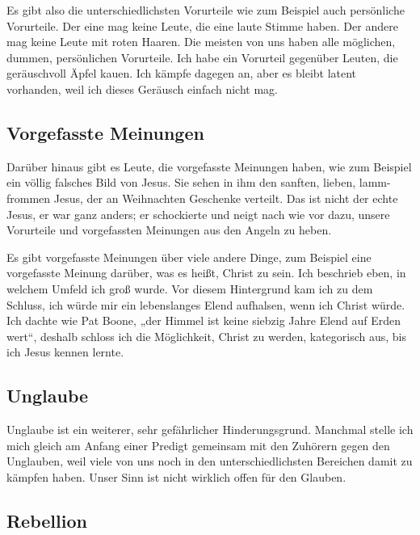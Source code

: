 Es gibt also die unterschiedlichsten Vorurteile wie zum Beispiel auch persönliche Vorurteile. 
Der eine mag keine Leute, die eine laute Stimme haben. 
Der andere mag keine Leute mit roten Haaren. Die meisten von uns haben alle möglichen, dummen, persönlichen Vorurteile. 
Ich habe ein Vorurteil gegenüber Leuten, die geräuschvoll Äpfel kauen. 
Ich kämpfe dagegen an, aber es bleibt latent vorhanden, weil ich dieses Geräusch einfach nicht mag.

\subsection{Vorgefasste Meinungen}

Darüber hinaus gibt es Leute, die vorgefasste Meinungen haben, wie zum Beispiel ein völlig falsches Bild von Jesus. 
Sie sehen in ihm den sanften, lieben, lamm-frommen Jesus, der an Weihnachten Geschenke verteilt. 
Das ist nicht der echte Jesus, er war ganz anders; er schockierte und neigt nach wie vor dazu, unsere Vorurteile und vorgefassten Meinungen aus den Angeln zu heben.

Es gibt vorgefasste Meinungen über viele andere Dinge, zum Beispiel eine vorgefasste Meinung darüber, was es heißt, Christ zu sein. 
Ich beschrieb eben, in welchem Umfeld ich groß wurde. 
Vor diesem Hintergrund kam ich zu dem Schluss, ich würde mir ein lebenslanges Elend aufhalsen, wenn ich Christ würde. 
Ich dachte wie Pat Boone, „der Himmel ist keine siebzig Jahre Elend auf Erden wert“, deshalb schloss ich die Möglichkeit, Christ zu werden, kategorisch aus, bis ich Jesus kennen lernte.

\subsection{Unglaube}

Unglaube ist ein weiterer, sehr gefährlicher Hinderungsgrund. 
Manchmal stelle ich mich gleich am Anfang einer Predigt gemeinsam mit den Zuhörern gegen den Unglauben, weil viele von uns noch in den unterschiedlichsten Bereichen damit zu kämpfen haben. 
Unser Sinn ist nicht wirklich offen für den Glauben.


\subsection{Rebellion}

